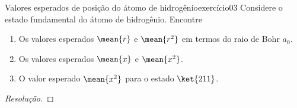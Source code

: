 \begin{exercício}{Valores esperados de posição do átomo de hidrogênio}{exercício03}
    Considere o estado fundamental do átomo de hidrogênio. Encontre
    \begin{enumerate}[label=(\alph*)]
        \item Os valores esperados \(\mean{r}\) e \(\mean{r^2}\) em termos do raio de Bohr \(a_0\).
        \item Os valores esperados \(\mean{x}\) e \(\mean{x^2}\). 
        \item O valor esperado \(\mean{x^2}\) para o estado \(\ket{211}\).
    \end{enumerate}
\end{exercício}
\begin{proof}[Resolução]

\end{proof}
